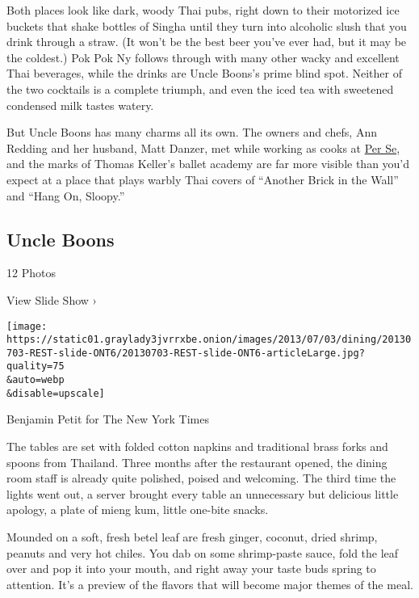 Both places look like dark, woody Thai pubs, right down to their
motorized ice buckets that shake bottles of Singha until they turn into
alcoholic slush that you drink through a straw. (It won't be the best
beer you've ever had, but it may be the coldest.) Pok Pok Ny follows
through with many other wacky and excellent Thai beverages, while the
drinks are Uncle Boons's prime blind spot. Neither of the two cocktails
is a complete triumph, and even the iced tea with sweetened condensed
milk tastes watery.

But Uncle Boons has many charms all its own. The owners and chefs, Ann
Redding and her husband, Matt Danzer, met while working as cooks at
\href{http://www.nytimes3xbfgragh.onion/2011/10/12/dining/reviews/per-se-nyc-restaurant-review.html?pagewanted=all}{Per
Se}, and the marks of Thomas Keller's ballet academy are far more
visible than you'd expect at a place that plays warbly Thai covers of
``Another Brick in the Wall'' and ``Hang On, Sloopy.''

\href{https://www.nytimes3xbfgragh.onion/slideshow/2013/07/03/dining/20130703-REST.html}{}

\hypertarget{uncle-boons}{%
\subsection{Uncle Boons}\label{uncle-boons}}

12 Photos

View Slide Show ›

\texttt{[image: https://static01.graylady3jvrrxbe.onion/images/2013/07/03/dining/20130703-REST-slide-ONT6/20130703-REST-slide-ONT6-articleLarge.jpg?quality=75\\\&auto=webp\\\&disable=upscale]}

Benjamin Petit for The New York Times

The tables are set with folded cotton napkins and traditional brass
forks and spoons from Thailand. Three months after the restaurant
opened, the dining room staff is already quite polished, poised and
welcoming. The third time the lights went out, a server brought every
table an unnecessary but delicious little apology, a plate of mieng kum,
little one-bite snacks.

Mounded on a soft, fresh betel leaf are fresh ginger, coconut, dried
shrimp, peanuts and very hot chiles. You dab on some shrimp-paste sauce,
fold the leaf over and pop it into your mouth, and right away your taste
buds spring to attention. It's a preview of the flavors that will become
major themes of the meal.

